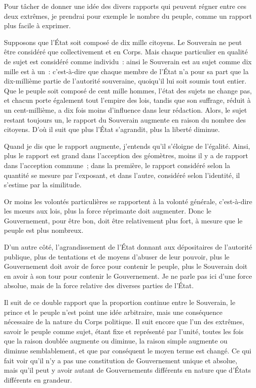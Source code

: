 \documentclass[french,twoside]{book} %
\begin{document}
Pour tâcher de donner une idée des divers rapports qui peuvent régner entre ces deux extrêmes, je prendrai pour exemple le nombre du peuple, comme un rapport plus facile à exprimer.\par
Supposons que l’État soit composé de dix mille citoyens. Le Souverain ne peut être considéré que collectivement et en Corps. Mais chaque particulier en qualité de sujet est considéré comme individu : ainsi le Souverain est au sujet comme dix mille est à un : c’est-à-dire que chaque membre de l’État n’a pour sa part que la dix-millième partie de l’autorité souveraine, quoiqu’il lui soit soumis tout entier. Que le peuple soit composé de cent mille hommes, l’état des sujets ne change pas, et chacun porte également tout l’empire des lois, tandis que son suffrage, réduit à un cent-millième, a dix fois moins d’influence dans leur rédaction. Alors, le sujet restant toujours un, le rapport du Souverain augmente en raison du nombre des citoyens. D’où il suit que plus l’État s’agrandit, plus la liberté diminue.\par
Quand je dis que le rapport augmente, j’entends qu’il s’éloigne de l’égalité. Ainsi, plus le rapport est grand dans l’acception des géomètres, moins il y a de rapport dans l’acception commune ; dans la première, le rapport considéré selon la quantité se mesure par l’exposant, et dans l’autre, considéré selon l’identité, il s’estime par la similitude.\par
Or moins les volontés particulières se rapportent à la volonté générale, c’est-à-dire les mœurs aux lois, plus la force réprimante doit augmenter. Donc le Gouvernement, pour être bon, doit être relativement plus fort, à mesure que le peuple est plus nombreux.\par
D’un autre côté, l’agrandissement de l’État donnant aux dépositaires de l’autorité publique, plus de tentations et de moyens d’abuser de leur pouvoir, plus le Gouvernement doit avoir de force pour contenir le peuple, plus le Souverain doit en avoir à son tour pour contenir le Gouvernement. Je ne parle pas ici d’une force absolue, mais de la force relative des diverses parties de l’État.\par
Il suit de ce double rapport que la proportion continue entre le Souverain, le prince et le peuple n’est point une idée arbitraire, mais une conséquence nécessaire de la nature du Corps politique. Il suit encore que l’un des extrêmes, savoir le peuple comme sujet, étant fixe et représenté par l’unité, toutes les fois que la raison doublée augmente ou diminue, la raison simple augmente ou diminue semblablement, et que par conséquent le moyen terme est changé. Ce qui fait voir qu’il n’y a pas une constitution de Gouvernement unique et absolue, mais qu’il peut y avoir autant de Gouvernements différents en nature que d’États différents en grandeur.\par
\end{document}
